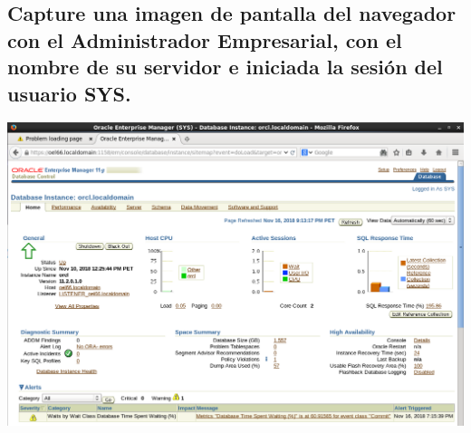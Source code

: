 \documentclass[12pt,letterpaper]{article}
\begin{document}
\subsection{Capture una imagen de pantalla del navegador con el Administrador Empresarial, con el nombre de su servidor e iniciada la sesión del usuario SYS.}
\vspace{12pt}
\begin{center}
  \includegraphics[width=16cm]{Imagenes/Oracle_servidor.png}\\
\end{center}
\break
\end{document}
